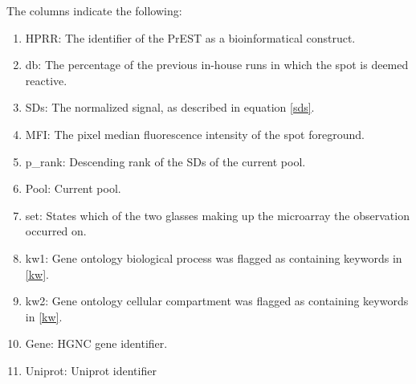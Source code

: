 \documentclass{article}
\begin{document}
The columns indicate the following:
\begin{enumerate}
    \item HPRR: The identifier of the PrEST as a bioinformatical construct.
    \item db: The percentage of the previous in-house runs in which the spot is deemed reactive.
    \item SDs: The normalized signal, as described in equation \ref{sds}.
    \item MFI: The pixel median fluorescence intensity of the spot foreground.
    \item p\_rank: Descending rank of the SDs of the current pool.
    \item Pool: Current pool.
    \item set: States which of the two glasses making up the microarray the observation occurred on.
    \item kw1: Gene ontology biological process was flagged as containing keywords in \ref{kw}.
    \item kw2: Gene ontology cellular compartment was flagged as containing keywords in \ref{kw}.
    \item Gene: HGNC gene identifier.
    \item Uniprot: Uniprot identifier
\end{enumerate}


\end{document}
